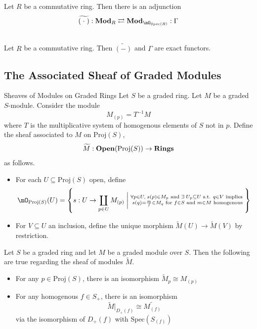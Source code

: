 \documentclass[a4paper]{article}
\begin{document}
\begin{prp}{}{} Let $R$ be a commutative ring. Then there is an adjunction $$\widetilde{(\;\cdot\;)}:\bold{Mod}_R\rightleftarrows\bold{Mod}_{\mO_{\text{Spec}(R)}}:\Gamma$$
\end{prp}

\begin{prp}{}{}\\
Let $R$ be a commutative ring. Then $\widetilde{(-)}$ and $\Gamma$ are exact functors. 
\end{prp}

\subsection{The Associated Sheaf of Graded Modules}
\begin{defn}{Sheaves of Modules on Graded Rings}{} Let $S$ be a graded ring. Let $M$ be a graded $S$-module. Consider the module $$M_{(p)}=T^{-1}M$$ where $T$ is the multiplicative system of homogenous elements of $S$ not in $p$. Define the sheaf associated to $M$ on $\text{Proj}(S)$, $$\widetilde{M}:\bold{Open}(\text{Proj}(S))\to\bold{Rings}$$ as follows. 
\begin{itemize}
\item For each $U\subseteq\text{Proj}(S)$ open, define $$\mO_{\text{Proj}(S)}(U)=\left\{s:U\to\coprod_{p\in U}M_{(p)}\;\bigg{|}\;\substack{\forall p\in U,\;s(p)\in M_p\text{ and }\exists\;U_p\subseteq U\text{ s.t. }q\in V\text{ implies }\\s(q)=\frac{m}{f}\in M_q\text{ for }f\in S\text{ and }m\in M\text{ homogenous}}\right\}$$
\item For $V\subseteq U$ an inclusion, define the unique morphism $\widetilde{M}(U)\to\widetilde{M}(V)$ by restriction. 
\end{itemize}
\end{defn}

\begin{prp}{}{} Let $S$ be a graded ring and let $M$ be a graded module over $S$. Then the following are true regarding the sheaf of modules $\widetilde{M}$. 
\begin{itemize}
\item For any $p\in\text{Proj}(S)$, there is an isomorphism $\widetilde{M}_p\cong M_{(p)}$
\item For any homogenous $f\in S_+$, there is an isomorphism $$\widetilde{M}|_{D_+(f)}\cong\widetilde{M_{(f)}}$$ via the isomorphism of $D_+(f)$ with $\text{Spec}(S_{(f)})$
\end{itemize}
\end{prp}
\end{document}
